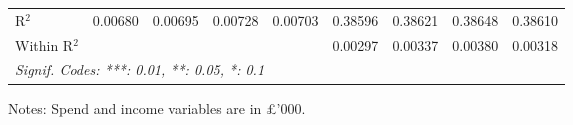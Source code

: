 \begin{table}[htbp]
\begin{threeparttable}[b]
\begin{tabular}{lcccccccc}
         R$^2$                     & 0.00680        & 0.00695        & 0.00728         & 0.00703        & 0.38596         & 0.38621         & 0.38648         & 0.38610\\  
         Within R$^2$              &                &                &                 &                & 0.00297         & 0.00337         & 0.00380         & 0.00318\\  
         \midrule \midrule
         \multicolumn{9}{l}{\emph{Signif. Codes: ***: 0.01, **: 0.05, *: 0.1}}\\
      \end{tabular}
      
      \begin{tablenotes}\footnotesize
         \item Notes: Spend and income variables are in \pounds'000.
      \end{tablenotes}
   \end{threeparttable}
\end{table}


